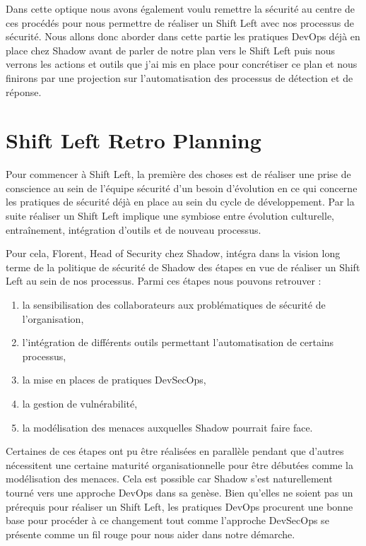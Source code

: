 \documentclass[
  11pt,
  a4paper,
  krantz2,
  11pt,
  oneside]{krantz}
\begin{document}
Dans cette optique nous avons également voulu remettre la sécurité au centre de ces procédés pour nous permettre de réaliser un Shift Left avec nos processus de sécurité. Nous allons donc aborder dans cette partie les pratiques DevOps déjà en place chez Shadow avant de parler de notre plan vers le Shift Left puis nous verrons les actions et outils que j'ai mis en place pour concrétiser ce plan et nous finirons par une projection sur l'automatisation des processus de détection et de réponse.

\section{Shift Left Retro Planning}\label{shift-left-retro-planning}

Pour commencer à Shift Left, la première des choses est de réaliser une prise de conscience au sein de l'équipe sécurité d'un besoin d'évolution en ce qui concerne les pratiques de sécurité déjà en place au sein du cycle de développement. Par la suite réaliser un Shift Left implique une symbiose entre évolution culturelle, entraînement, intégration d'outils et de nouveau processus.

Pour cela, Florent, Head of Security chez Shadow, intégra dans la vision long terme de la politique de sécurité de Shadow des étapes en vue de réaliser un Shift Left au sein de nos processus. Parmi ces étapes nous pouvons retrouver :

\begin{enumerate}
\def\labelenumi{\roman{enumi}.}
\item
  la sensibilisation des collaborateurs aux problématiques de sécurité de l'organisation,
\item
  l'intégration de différents outils permettant l'automatisation de certains processus,
\item
  la mise en places de pratiques DevSecOps,
\item
  la gestion de vulnérabilité,
\item
  la modélisation des menaces auxquelles Shadow pourrait faire face.
\end{enumerate}

Certaines de ces étapes ont pu être réalisées en parallèle pendant que d'autres nécessitent une certaine maturité organisationnelle pour être débutées comme la modélisation des menaces. Cela est possible car Shadow s'est naturellement tourné vers une approche DevOps dans sa genèse. Bien qu'elles ne soient pas un prérequis pour réaliser un Shift Left, les pratiques DevOps procurent une bonne base pour procéder à ce changement tout comme l'approche DevSecOps se présente comme un fil rouge pour nous aider dans notre démarche.
\end{document}

